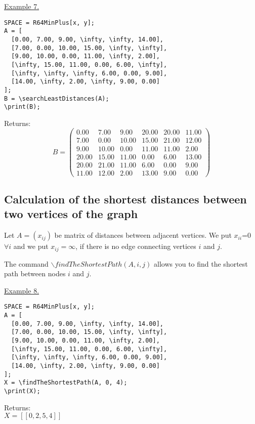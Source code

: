 \smallskip

\underline{Example 7. }

\vspace*{-3mm}
\begin{verbatim}
SPACE = R64MinPlus[x, y];
A = [
  [0.00, 7.00, 9.00, \infty, \infty, 14.00],
  [7.00, 0.00, 10.00, 15.00, \infty, \infty],
  [9.00, 10.00, 0.00, 11.00, \infty, 2.00],
  [\infty, 15.00, 11.00, 0.00, 6.00, \infty],
  [\infty, \infty, \infty, 6.00, 0.00, 9.00],
  [14.00, \infty, 2.00, \infty, 9.00, 0.00]
];
B = \searchLeastDistances(A);
\print(B);
\end{verbatim}

Returns:\\
$$B= \left(\begin{array}{cccccc}
0.00 & 7.00 & 9.00 & 20.00 & 20.00 & 11.00\\
7.00 & 0.00 & 10.00 & 15.00 & 21.00 & 12.00\\
9.00 & 10.00 & 0.00 & 11.00 & 11.00 & 2.00\\
20.00 & 15.00 & 11.00 & 0.00 & 6.00 & 13.00\\
20.00 & 21.00 & 11.00 & 6.00 & 0.00 & 9.00\\
11.00 & 12.00 & 2.00 & 13.00 & 9.00 & 0.00
\end{array}\right) $$
\subsection {Calculation of the shortest distances between two vertices of the graph}
Let $A=(x_{ij})$ be matrix of distances between adjacent vertices. We put $x_{ii}$=0 $\forall i$ and we put $x_{ij}=\infty$, if there is no edge connecting vertices $i$ and $j$.

The command $\backslash findTheShortestPath(A, i, j)$ allows you to find the shortest path between nodes $i$ and $j$.
\smallskip

\underline{Example 8. }

\vspace*{-3mm}
\begin{verbatim}
SPACE = R64MinPlus[x, y];
A = [
  [0.00, 7.00, 9.00, \infty, \infty, 14.00],
  [7.00, 0.00, 10.00, 15.00, \infty, \infty],
  [9.00, 10.00, 0.00, 11.00, \infty, 2.00],
  [\infty, 15.00, 11.00, 0.00, 6.00, \infty],
  [\infty, \infty, \infty, 6.00, 0.00, 9.00],
  [14.00, \infty, 2.00, \infty, 9.00, 0.00]
];
X = \findTheShortestPath(A, 0, 4);
\print(X);
\end{verbatim}

Returns:\\
$X=[[0, 2, 5, 4]]$
 
